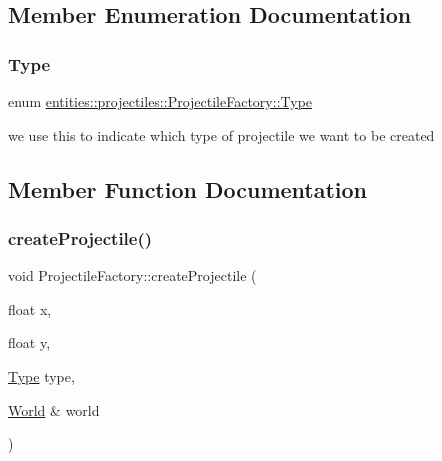 \subsection{Member Enumeration Documentation}
\mbox{\label{classentities_1_1projectiles_1_1ProjectileFactory_abc75eceeed2dbadc736fb93fd6046698}} 
\subsubsection{\texorpdfstring{Type}{Type}}
{\footnotesize\ttfamily enum \hyperlink{classentities_1_1projectiles_1_1ProjectileFactory_abc75eceeed2dbadc736fb93fd6046698}{entities\+::projectiles\+::\+Projectile\+Factory\+::\+Type}}

we use this to indicate which type of projectile we want to be created 

\subsection{Member Function Documentation}
\mbox{\label{classentities_1_1projectiles_1_1ProjectileFactory_ae2fdae24114f0a54e474e1cf14eb34d5}} 
\subsubsection{\texorpdfstring{create\+Projectile()}{createProjectile()}}
{\footnotesize\ttfamily void Projectile\+Factory\+::create\+Projectile (\begin{DoxyParamCaption}\item[{float}]{x,  }\item[{float}]{y,  }\item[{\hyperlink{classentities_1_1projectiles_1_1ProjectileFactory_abc75eceeed2dbadc736fb93fd6046698}{Type}}]{type,  }\item[{\hyperlink{classWorld}{World} \&}]{world }\end{DoxyParamCaption})\hspace{0.3cm}{\ttfamily [static]}}

